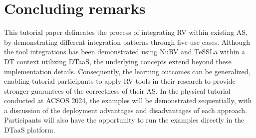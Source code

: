 \section{Concluding remarks} \label{sec:conclude}

This tutorial paper delineates the process of integrating RV within existing AS, by demonstrating different integration patterns through five use cases.
Although the tool integrations has been demonstrated using NuRV and TeSSLa within a DT context utilizing DTaaS, the underlying concepts extend beyond these implementation details.
Consequently, the learning outcomes can be generalized, enabling tutorial participants to apply RV tools in their research to provide stronger guarantees of the correctness of their AS.
In the physical tutorial conducted at ACSOS 2024, the examples will be demonstrated sequentially, with a discussion of the deployment advantages and disadvantages of each approach.
Participants will also have the opportunity to run the examples directly in the DTaaS platform.
